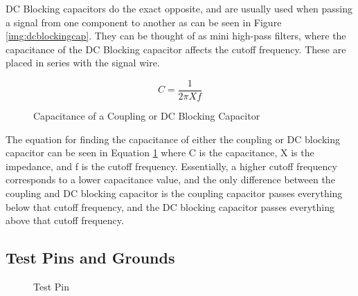 DC Blocking capacitors do the exact opposite, and are usually used when passing a signal from one component to another as can be 
seen in Figure \ref{img:dcblockingcap}. They can be thought of as mini high-pass filters, where the capacitance of the DC Blocking
capacitor affects the cutoff frequency. These are placed in series with the signal wire.
\begin{figure}[H]
\begin{equation}
  C = \frac{1}{2\pi Xf}
  \end{equation}
  \caption{Capacitance of a Coupling or DC Blocking Capacitor}
  \label{eq:capacitance}
\end{figure}
The equation for finding the capacitance of either the coupling or DC blocking capacitor can be seen in Equation \ref{eq:capacitance} 
where C is the capacitance, X is the impedance, and f is the cutoff frequency.
Essentially, a higher cutoff frequency corresponds to a lower capacitance value, and the only difference between the coupling and
DC blocking capacitor is the coupling capacitor passes everything below that cutoff frequency, and the DC blocking capacitor passes
everything above that cutoff frequency.
\subsection{Test Pins and Grounds}
\begin{figure}[H]
  \centering
\caption{Test Pin}
\label{img:testpin}
\end{figure}

